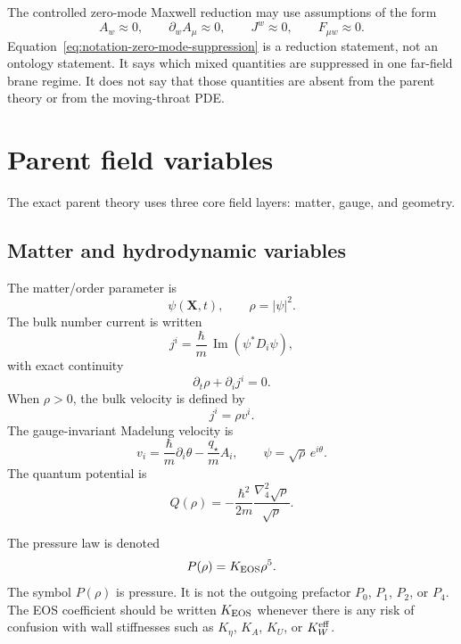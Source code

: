 The controlled zero-mode Maxwell reduction may use assumptions of the form
\begin{equation}
  A_w\approx0,
  \qquad
  \partial_wA_\mu\approx0,
  \qquad
  J^w\approx0,
  \qquad
  F_{\mu w}\approx0.
  \label{eq:notation-zero-mode-suppression}
\end{equation}
Equation~\eqref{eq:notation-zero-mode-suppression} is a reduction statement, not an ontology statement.  It says which mixed quantities are suppressed in one far-field brane regime.  It does not say that those quantities are absent from the parent theory or from the moving-throat PDE.

\section{Parent field variables}
\label{sec:notation-parent-fields}

The exact parent theory uses three core field layers: matter, gauge, and geometry.

\subsection{Matter and hydrodynamic variables}
\label{subsec:notation-matter}

The matter/order parameter is
\begin{equation}
  \psi(\mathbf X,t),
  \qquad
  \rho=|\psi|^2.
\end{equation}
The bulk number current is written
\begin{equation}
  j^i=\frac{\hbar}{m}\,\operatorname{Im}(\psi^*D_i\psi),
\end{equation}
with exact continuity
\begin{equation}
  \partial_t\rho+\partial_i j^i=0.
\end{equation}
When \(\rho>0\), the bulk velocity is defined by
\begin{equation}
  j^i=\rho v^i.
\end{equation}
The gauge-invariant Madelung velocity is
\begin{equation}
  v_i=\frac{\hbar}{m}\partial_i\theta-\frac{q_\star}{m}A_i,
  \qquad
  \psi=\sqrt\rho\,e^{i\theta}.
\end{equation}
The quantum potential is
\begin{equation}
  Q(\rho)=-\frac{\hbar^2}{2m}\frac{\nabla_4^2\sqrt\rho}{\sqrt\rho}.
\end{equation}

The pressure law is denoted
\begin{equation}
  P(\rho)=K_{\rm EOS}\rho^5.
\end{equation}
The symbol \(P(\rho)\) is pressure.  It is not the outgoing prefactor \(P_0\), \(P_1\), \(P_2\), or \(P_4\).  The EOS coefficient should be written \(K_{\rm EOS}\) whenever there is any risk of confusion with wall stiffnesses such as \(K_\eta\), \(K_A\), \(K_U\), or \(K_W^{\rm eff}\).

